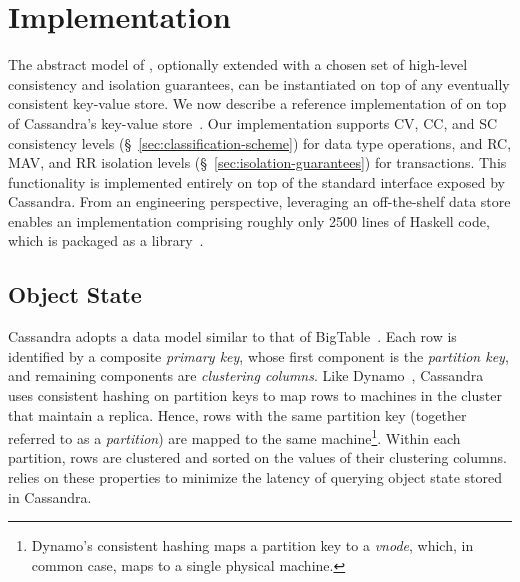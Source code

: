 \section{Implementation}
\label{sec:implementation}

The abstract model of \name, optionally extended with a chosen set of
high-level consistency and isolation guarantees, can be instantiated
on top of any eventually consistent key-value store. We now describe a
reference implementation of \name on top of Cassandra's key-value
store~\cite{Cassandra}. Our implementation supports CV, CC, and SC
consistency levels (\S~\ref{sec:classification-scheme}) for data type
operations, and RC, MAV, and RR isolation levels
(\S~\ref{sec:isolation-guarantees}) for transactions. This
functionality is implemented entirely on top of the standard interface
exposed by Cassandra. From an engineering perspective, leveraging an
off-the-shelf data store enables an implementation comprising roughly
only 2500 lines of Haskell code, which is packaged as a
library~\cite{QueleaHackage}.

\subsection{Object State}


Cassandra adopts a data model similar to that of
BigTable~\cite{BigTable}. Each row is identified by a composite
\emph{primary key}, whose first component is the \emph{partition key},
and remaining components are \emph{clustering columns}. Like
Dynamo~\cite{Dynamo}, Cassandra uses consistent hashing on partition
keys to map rows to machines in the cluster that maintain a replica.
Hence, rows with the same partition key (together referred to as a
\emph{partition}) are mapped to the same machine\footnote{Dynamo's
consistent hashing maps a partition key to a \emph{vnode}, which, in
common case, maps to a single physical machine.}. Within each
partition, rows are clustered and sorted on the values of their
clustering columns. \name relies on these properties to minimize the
latency of querying object state stored in Cassandra.


